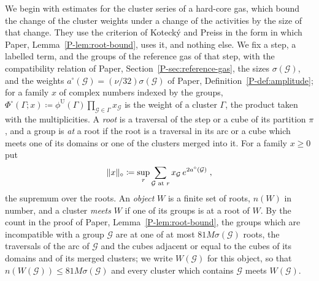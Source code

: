 \documentclass[11pt]{preprint}
\DeclarePairedDelimiter{\norm}{\lVert}{\rVert}
\numberwithin{equation}{section}
\theoremstyle{definition}
\theoremstyle{remark}
\theoremstyle{plain}
\begin{document}
We begin with estimates for the cluster series of a hard-core gas, which bound the change of the cluster weights under a change of the activities by the size of that change. They use the criterion of Koteck\'y and Preiss in the form in which Paper, Lemma~\ref{P-lem:root-bound}, uses it, and nothing else. We fix a step, a labelled term, and the groups of the reference gas of that step, with the compatibility relation of Paper, Section~\ref{P-sec:reference-gas}, the sizes $\sigma(\mathcal G)$, and the weights $a^\circ(\mathcal G) = (\nu/32)\sigma(\mathcal G)$ of Paper, Definition~\ref{P-def:amplitude}; for a family $x$ of complex numbers indexed by the groups, $\Phi^\circ(\Gamma; x) \coloneqq \phi^{\mathrm U}(\Gamma)\prod_{\mathcal G \in \Gamma}x_{\mathcal G}$ is the weight of a cluster $\Gamma$, the product taken with the multiplicities. A \emph{root} is a traversal of the step or a cube of its partition $\pi$, and a group is \emph{at} a root if the root is a traversal in its arc or a cube which meets one of its domains or one of the clusters merged into it. For a family $x \geq 0$ put
\begin{equation}\label{eq:root-norm}
    \norm{x}_\circ \coloneqq \sup_r\sum_{\mathcal G \text{ at } r}x_{\mathcal G}\,e^{2a^\circ(\mathcal G)}\;,
\end{equation}
the supremum over the roots. An \emph{object} $W$ is a finite set of roots, $n(W)$ in number, and a cluster \emph{meets} $W$ if one of its groups is at a root of $W$. By the count in the proof of Paper, Lemma~\ref{P-lem:root-bound}, the groups which are incompatible with a group $\mathcal G$ are at one of at most $81M\sigma(\mathcal G)$ roots, the traversals of the arc of $\mathcal G$ and the cubes adjacent or equal to the cubes of its domains and of its merged clusters; we write $W(\mathcal G)$ for this object, so that $n(W(\mathcal G)) \leq 81M\sigma(\mathcal G)$ and every cluster which contains $\mathcal G$ meets $W(\mathcal G)$.
\end{document}
